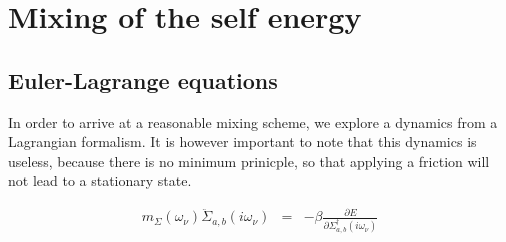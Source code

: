 \documentclass[11pt,a4paper]{report}
\begin{document}
\chapter{Mixing of the self energy}
\label{sec:mixing}
\section{Euler-Lagrange equations}
In order to arrive at a reasonable mixing scheme, we explore a
dynamics from a Lagrangian formalism. It is however important to note
that this dynamics is useless, because there is no minimum prinicple,
so that applying a friction will not lead to a stationary state.

\begin{eqnarray*}
m_\Sigma(\omega_\nu)\ddot{\Sigma}_{a,b}(i\omega_\nu)
&=&-\beta\frac{\partial{E}}
{\partial\Sigma^\dagger_{a,b}(i\omega_\nu)}
\end{eqnarray*}
\end{document}
